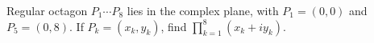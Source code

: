 Regular octagon $P_1\cdots P_8$ lies in the complex plane, with $P_1=(0,0)$ and $P_5=(0,8)$. If $P_k=(x_k,y_k)$, find $\prod_{k=1}^8(x_k+iy_k)$.
